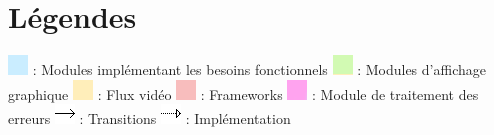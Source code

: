 \documentclass[12pt,a4paper]{article}
\begin{document}
\section{Légendes}
\noindent
\includegraphics[scale=0.5]{bleu.png} : Modules implémentant les besoins fonctionnels\newline
\includegraphics[scale=0.5]{vert.png} : Modules d'affichage graphique\newline
\includegraphics[scale=0.5]{orange.png} : Flux vidéo\newline
\includegraphics[scale=0.5]{rouge.png} : Frameworks\newline
\includegraphics[scale=0.5]{rose.png} :  Module de traitement des erreurs\newline
\includegraphics[scale=0.5]{fleche.png} :  Transitions\newline
\includegraphics[scale=0.5]{fleche_pointille.png} :  Implémentation\newline

\end{document}
